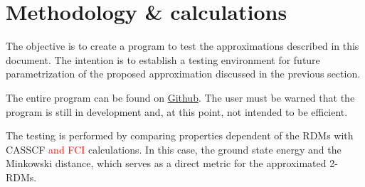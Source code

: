 \section{Methodology \& calculations} %
\label{sec:methodology-calculations}
The objective is to create a program to test the approximations described in
this document.
The intention is to establish a testing environment for future parametrization 
of the proposed approximation discussed in the previous section.

The entire program can be found on 
\href{https://github.com/jaqg/density-matrix}{Github}.
The user must be warned that the program is still in development and, at this
point, not intended to be efficient.

The testing is performed by comparing properties dependent of the
RDMs with CASSCF \textcolor{red}{and FCI} calculations.
In this case, the ground state energy and the Minkowski distance, which serves
as a direct metric for the approximated 2-RDMs.
